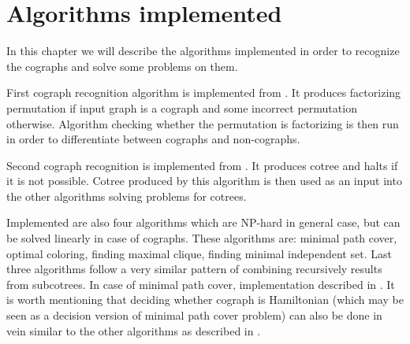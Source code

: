 
\chapter{Algorithms implemented}\label{r:codefeq}

In this chapter we will describe the algorithms implemented in order to recognize the cographs and solve some problems on them.

First cograph recognition algorithm is implemented from \cite{habib}. It produces factorizing permutation if input graph is a cograph and some incorrect permutation otherwise. Algorithm checking whether the permutation is factorizing is then run in order to differentiate between cographs and non-cographs.

Second cograph recognition is implemented from \cite{corneil}. It produces cotree and halts if it is not possible. Cotree produced by this algorithm is then used as an input into the other algorithms solving problems for cotrees.

Implemented are also four algorithms which are NP-hard in general case, but can be solved linearly in case of cographs. These algorithms are: minimal path cover, optimal coloring, finding maximal clique, finding minimal independent set. Last three algorithms follow a very similar pattern of combining recursively results from subcotrees. In case of minimal path cover, implementation described in \cite{olariu}. It is worth mentioning that deciding whether cograph is Hamiltonian (which may be seen as a decision version of minimal path cover problem) can also be done in vein similar to the other algorithms as described in \cite{corneil2}.
